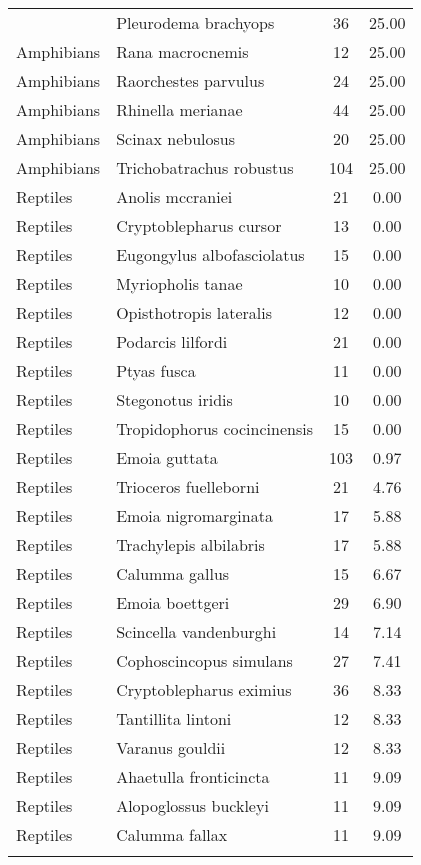 \begin{longtable}{llcc}
{  Amphibians & Pleurodema brachyops &  36 & 25.00 \\ 
  Amphibians & Rana macrocnemis &  12 & 25.00 \\ 
  Amphibians & Raorchestes parvulus &  24 & 25.00 \\ 
  Amphibians & Rhinella merianae &  44 & 25.00 \\ 
  Amphibians & Scinax nebulosus &  20 & 25.00 \\ 
  Amphibians & Trichobatrachus robustus & 104 & 25.00 \\ 
  Reptiles & Anolis mccraniei &  21 & 0.00 \\ 
  Reptiles & Cryptoblepharus cursor &  13 & 0.00 \\ 
  Reptiles & Eugongylus albofasciolatus &  15 & 0.00 \\ 
  Reptiles & Myriopholis tanae &  10 & 0.00 \\ 
  Reptiles & Opisthotropis lateralis &  12 & 0.00 \\ 
  Reptiles & Podarcis lilfordi &  21 & 0.00 \\ 
  Reptiles & Ptyas fusca &  11 & 0.00 \\ 
  Reptiles & Stegonotus iridis &  10 & 0.00 \\ 
  Reptiles & Tropidophorus cocincinensis &  15 & 0.00 \\ 
  Reptiles & Emoia guttata & 103 & 0.97 \\ 
  Reptiles & Trioceros fuelleborni &  21 & 4.76 \\ 
  Reptiles & Emoia nigromarginata &  17 & 5.88 \\ 
  Reptiles & Trachylepis albilabris &  17 & 5.88 \\ 
  Reptiles & Calumma gallus &  15 & 6.67 \\ 
  Reptiles & Emoia boettgeri &  29 & 6.90 \\ 
  Reptiles & Scincella vandenburghi &  14 & 7.14 \\ 
  Reptiles & Cophoscincopus simulans &  27 & 7.41 \\ 
  Reptiles & Cryptoblepharus eximius &  36 & 8.33 \\ 
  Reptiles & Tantillita lintoni &  12 & 8.33 \\ 
  Reptiles & Varanus gouldii &  12 & 8.33 \\ 
  Reptiles & Ahaetulla fronticincta &  11 & 9.09 \\ 
  Reptiles & Alopoglossus buckleyi &  11 & 9.09 \\ 
  Reptiles & Calumma fallax &  11 & 9.09 \\ 
}
\end{longtable}
